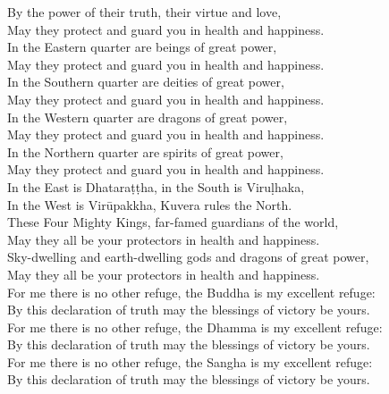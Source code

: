 \begin{onechants}
By the power of their truth, their virtue and love,\\
May they protect and guard you in health and happiness.\\
In the Eastern quarter are beings of great power,\\
May they protect and guard you in health and happiness.\\
In the Southern quarter are deities of great power,\\
May they protect and guard you in health and happiness.\\
In the Western quarter are dragons of great power,\\
May they protect and guard you in health and happiness.\\
In the Northern quarter are spirits of great power,\\
May they protect and guard you in health and happiness.\\
In the East is Dhataraṭṭha, in the South is Viruḷhaka,\\
In the West is Virūpakkha, Kuvera rules the North.\\
These Four Mighty Kings, far-famed guardians of the world,\\
May they all be your protectors in health and happiness.\\
Sky-dwelling and earth-dwelling gods and dragons of great power,\\
May they all be your protectors in health and happiness.\\
For me there is no other refuge, the Buddha is my excellent refuge:\\
By this declaration of truth may the blessings of victory be yours.\\
For me there is no other refuge, the Dhamma is my excellent refuge:\\
By this declaration of truth may the blessings of victory be yours.\\
For me there is no other refuge, the Sangha is my excellent refuge:\\
By this declaration of truth may the blessings of victory be yours.\\
\end{onechants}

\clearpage

\paliText

